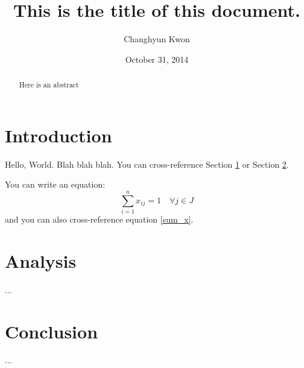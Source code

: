 \documentclass[letterpaper, 11pt]{article}
\title{This is the title of this document.}
\author{Changhyun Kwon}
\date{October 31, 2014}
\begin{document}
\maketitle

\begin{abstract}
Here is an abstract
\end{abstract}


\section{Introduction} \label{sec:intro}

Hello, World. 
Blah blah blah. 
You can cross-reference Section \ref{sec:intro} or Section \ref{sec:analysis}.

You can write an equation:
\begin{equation}
\sum_{i=1}^n x_{ij} = 1 \quad \forall j \in J \label{sum_x}
\end{equation}
and you can also cross-reference equation \eqref{sum_x}.


\section{Analysis} \label{sec:analysis}

...

\section{Conclusion} \label{sec:conclusion}

...
\end{document}

